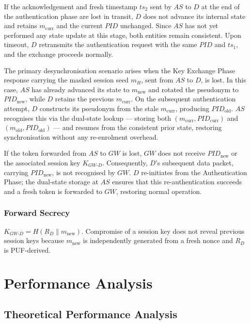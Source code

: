 \documentclass[conference]{IEEEtran}
\begin{document}
If the acknowledgement and fresh timestamp $ts_2$ sent by $AS$ to $D$ at the
end of the authentication phase are lost in transit, $D$ does not advance its internal state
and retains $m_{\mathrm{curr}}$ and the current $\mathit{PID}$ unchanged.
Since $AS$ has not yet performed any state update at this stage, both
entities remain consistent.  Upon timeout, $D$ retransmits the authentication request
with the same $\mathit{PID}$ and $ts_1$, and the exchange proceeds
normally.

The primary desynchronisation scenario arises when the Key Exchange Phase response
carrying the masked session seed $m_H$, sent from $AS$ to $D$, is lost.  In this
case, $AS$ has already advanced its state to $m_{\mathrm{new}}$ and rotated
the pseudonym to $\mathit{PID}_{\mathrm{new}}$, while $D$ retains the
previous $m_{\mathrm{curr}}$.  On the subsequent authentication attempt, $D$
constructs its pseudonym from the stale $m_{\mathrm{curr}}$, producing
$\mathit{PID}_{\mathrm{old}}$.  $AS$ recognises this via the dual-state
lookup — storing both $(m_{\mathrm{curr}}, \mathit{PID}_{\mathrm{curr}})$ and
$(m_{\mathrm{old}}, \mathit{PID}_{\mathrm{old}})$ — and resumes from the
consistent prior state, restoring synchronisation without any re-enrolment
overhead.

If the token forwarded from $AS$ to $GW$ is lost, $GW$ does not receive
$\mathit{PID}_{\mathrm{new}}$ or the associated session key $K_{GW\text{-}D}$.
Consequently, $D$'s subsequent data packet, carrying $\mathit{PID}_{\mathrm{new}}$,
is not recognised by $GW$.  $D$ re-initiates from the Authentication Phase; the dual-state
storage at $AS$ ensures that this re-authentication succeeds and a fresh
token is forwarded to $GW$, restoring normal operation.

\subsubsection{Forward Secrecy}
$K_{GW\text{-}D} = H(R_D \| m_{\mathrm{new}})$.  Compromise of a session key
does not reveal previous session keys because $m_{\mathrm{new}}$ is
independently generated from a fresh nonce and $R_D$ is PUF-derived.

\section{Performance Analysis}

\subsection{Theoretical Performance Analysis}
\end{document}
